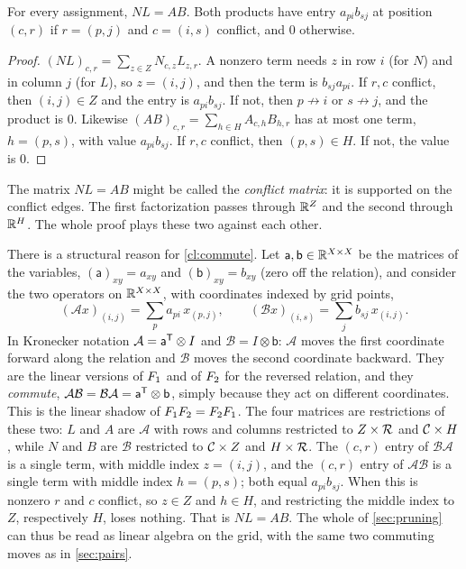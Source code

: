 \begin{claim}\label{cl:commute}
For every assignment, $NL=AB$. Both products have entry $a_{pi}b_{sj}$ at
position $(c,r)$ if $r=(p,j)$ and $c=(i,s)$ conflict, and $0$ otherwise.
\end{claim}

\begin{proof}
$(NL)_{c,r}=\sum_{z\in Z}N_{c,z}L_{z,r}$. A nonzero term needs $z$ in row $i$
(for $N$) and in column $j$ (for $L$), so $z=(i,j)$, and then the term is
$b_{sj}a_{pi}$. If $r,c$ conflict, then $(i,j)\in Z$ and the entry is
$a_{pi}b_{sj}$. If not, then $p\not\to i$ or $s\not\to j$, and the product is $0$.
Likewise $(AB)_{c,r}=\sum_{h\in H}A_{c,h}B_{h,r}$ has at most one term,
$h=(p,s)$, with value $a_{pi}b_{sj}$. If $r,c$ conflict, then $(p,s)\in H$. If
not, the value is $0$.
\end{proof}

The matrix $NL=AB$ might be called the \emph{conflict matrix}: it is
supported on the conflict edges. The first factorization passes through
$\mathbb R^Z$ and the second through $\mathbb R^H$. The whole proof plays these two
against each other.

\begin{remark}\label{rem:kronecker}
There is a structural reason for \cref{cl:commute}. Let
$\mathsf a,\mathsf b\in\mathbb R^{X\times X}$ be the matrices of the variables,
$(\mathsf a)_{xy}=a_{xy}$ and $(\mathsf b)_{xy}=b_{xy}$ (zero off the relation),
and consider the two operators on $\mathbb R^{X\times X}$, with coordinates
indexed by grid points,
\[
 (\mathcal A x)_{(i,j)}=\sum_{p}a_{pi}\,x_{(p,j)},\qquad
 (\mathcal B x)_{(i,s)}=\sum_{j}b_{sj}\,x_{(i,j)} .
\]
In Kronecker notation $\mathcal A=\mathsf a^{\mathsf T}\otimes I$ and
$\mathcal B=I\otimes\mathsf b$: $\mathcal A$ moves the first coordinate
forward along the relation and $\mathcal B$ moves the second coordinate
backward. They are the linear versions of $F_1$ and of $F_2$ for the
reversed relation, and they \emph{commute},
$\mathcal A\mathcal B=\mathcal B\mathcal A=\mathsf a^{\mathsf T}\otimes\mathsf b$,
simply because they act on different coordinates. This is the linear
shadow of $F_1F_2=F_2F_1$. The four matrices are restrictions of these
two: $L$ and $A$ are $\mathcal A$ with rows and columns restricted to
$Z\times\mathcal R$ and $\mathcal C\times H$, while $N$ and $B$ are $\mathcal B$
restricted to $\mathcal C\times Z$ and $H\times\mathcal R$. The $(c,r)$ entry of
$\mathcal B\mathcal A$ is a single term, with middle index $z=(i,j)$, and
the $(c,r)$ entry of $\mathcal A\mathcal B$ is a single term with middle
index $h=(p,s)$; both equal $a_{pi}b_{sj}$. When this is nonzero $r$ and
$c$ conflict, so $z\in Z$ and $h\in H$, and restricting the middle index to
$Z$, respectively $H$, loses nothing. That is $NL=AB$. The whole of
\cref{sec:pruning} can thus be read as linear algebra on the grid, with the
same two commuting moves as in \cref{sec:pairs}.
\end{remark}

